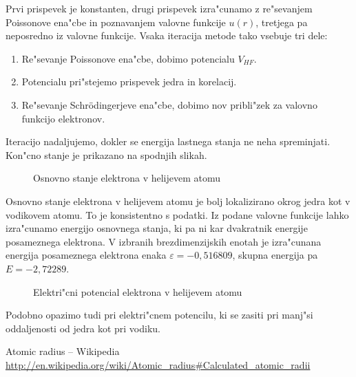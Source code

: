 \documentclass[a4paper,10pt]{article}
\begin{document}
Prvi prispevek je konstanten, drugi prispevek izra"cunamo z re"sevanjem Poissonove ena"cbe in poznavanjem valovne funkcije $u(r)$, tretjega pa neposredno iz valovne funkcije. 
Vsaka iteracija metode tako vsebuje tri dele:

\begin{enumerate}
 \item Re"sevanje Poissonove ena"cbe, dobimo potencialu $V_{HF}$. 
 \item Potencialu pri"stejemo prispevek jedra in korelacij.
 \item Re"sevanje Schr\"odingerjeve ena"cbe, dobimo nov pribli"zek za valovno funkcijo elektronov. 
\end{enumerate}

Iteracijo nadaljujemo, dokler se energija lastnega stanja ne neha spreminjati. 
Kon"cno stanje je prikazano na spodnjih slikah. 

\begin{figure}[H]

 \caption{Osnovno stanje elektrona v helijevem atomu}
 \label{fig:helij-sch}
\end{figure}

Osnovno stanje elektrona v helijevem atomu je bolj lokalizirano okrog jedra kot v vodikovem atomu. 
To je konsistentno s podatki\cite{wiki:radius}. 
Iz podane valovne funkcije lahko izra"cunamo energijo osnovnega stanja, ki pa ni kar dvakratnik energije posameznega elektrona. 
V izbranih brezdimenzijskih enotah je izra"cunana energija posameznega elektrona enaka $\varepsilon = -0,\!516809$, skupna energija pa $E = -2,\!72289$. 

\begin{figure}[H]

 \caption{Elektri"cni potencial elektrona v helijevem atomu}
 \label{fig:vodik-potencial}
\end{figure}

Podobno opazimo tudi pri elektri"cnem potencilu, ki se zasiti pri manj"si oddaljenosti od jedra kot pri vodiku. 

\begin{thebibliography}{6}
  Atomic radius -- Wikipedia \\ \url{http://en.wikipedia.org/wiki/Atomic_radius#Calculated_atomic_radii}
\end{thebibliography}
\end{document}
